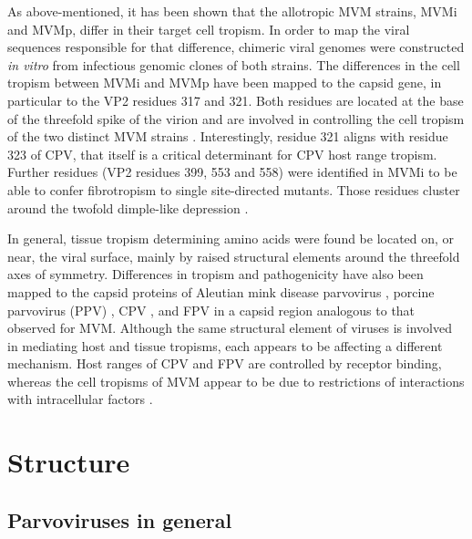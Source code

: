 	As above-mentioned, it has been shown that the allotropic MVM strains, MVMi and MVMp, differ in their target cell tropism. In order to map the viral sequences responsible for that difference, chimeric viral genomes were constructed \textit{in vitro} from infectious genomic clones of both strains. The differences in the cell tropism between MVMi and MVMp have been mapped to the capsid gene, in particular to the VP2 residues 317 and 321. Both residues are located at the base of the threefold spike of the virion and are involved in controlling the cell tropism of the two distinct MVM strains \cite{pmid3357208, pmid3392768, pmid3257270}.  Interestingly, residue 321 aligns with residue 323 of CPV, that itself is a critical determinant for CPV host range tropism. Further residues (VP2 residues 399, 553 and 558) were identified in MVMi to be able to confer fibrotropism to single site-directed mutants. Those residues cluster around the twofold dimple-like depression \cite{pmid9817841}. 
	
	In general, tissue tropism determining amino acids were found be located on, or near, the viral surface, mainly by raised structural elements around the threefold axes of symmetry. Differences in tropism and pathogenicity have also been mapped to the capsid proteins of Aleutian mink disease parvovirus \cite{pmid8396664}, porcine parvovirus (PPV)  \cite{pmid8642680}, CPV \cite{pmid3176341, pmid1331498}, and FPV \cite{pmid7513918} in a capsid region analogous to that observed for MVM. Although the same structural element of viruses is involved in mediating host and tissue tropisms, each appears to be affecting a different mechanism. Host ranges of CPV and FPV are controlled by receptor binding, whereas the cell tropisms of MVM appear to be due to restrictions of interactions with intracellular factors \cite{pmid9817841, pmid12941411}.



\section{Structure}

\subsection{Parvoviruses in general}

